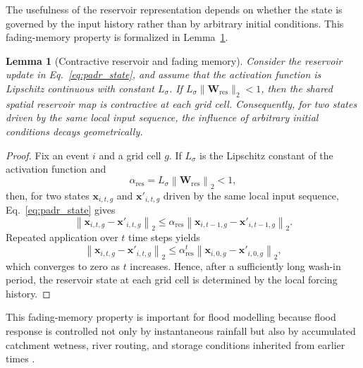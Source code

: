 \documentclass[pdflatex,sn-mathphys-ay]{sn-jnl}
\theoremstyle{thmstyleone}
\newtheorem{lemma}[theorem]{Lemma}
\begin{document}
The usefulness of the reservoir representation depends on whether the
state is governed by the input history rather than by arbitrary initial
conditions.  This fading-memory property is formalized in
Lemma~\ref{lem:echo_state}.

\begin{lemma}[Contractive reservoir and fading memory]
\label{lem:echo_state}
Consider the reservoir update in Eq.~\eqref{eq:padr_state}, and assume
that the activation function is Lipschitz continuous with constant
$L_{\sigma}$.  If
$L_{\sigma}\|\mathbf{W}_{\mathrm{res}}\|_{2}<1$, then the shared
spatial reservoir map is contractive at each grid cell.  Consequently,
for two states driven by the same local input sequence, the influence
of arbitrary initial conditions decays geometrically.
\end{lemma}

\begin{proof}
Fix an event $i$ and a grid cell $g$.  If $L_{\sigma}$ is the
Lipschitz constant of the activation function and
\begin{equation}
  \alpha_{\mathrm{res}}
  =
  L_{\sigma}
  \left\|
    \mathbf{W}_{\mathrm{res}}
  \right\|_{2}
  <1,
  \label{eq:reservoir_contractivity_condition}
\end{equation}
then, for two states $\mathbf{x}_{i,t,g}$ and $\mathbf{x}'_{i,t,g}$
driven by the same local input sequence, Eq.~\eqref{eq:padr_state}
gives
\begin{equation}
  \left\|
    \mathbf{x}_{i,t,g}
    -
    \mathbf{x}'_{i,t,g}
  \right\|_{2}
  \leq
  \alpha_{\mathrm{res}}
  \left\|
    \mathbf{x}_{i,t-1,g}
    -
    \mathbf{x}'_{i,t-1,g}
  \right\|_{2}.
  \label{eq:reservoir_one_step}
\end{equation}
Repeated application over $t$ time steps yields
\begin{equation}
  \left\|
    \mathbf{x}_{i,t,g}
    -
    \mathbf{x}'_{i,t,g}
  \right\|_{2}
  \leq
  \alpha_{\mathrm{res}}^{t}
  \left\|
    \mathbf{x}_{i,0,g}
    -
    \mathbf{x}'_{i,0,g}
  \right\|_{2},
  \label{eq:reservoir_fading_memory}
\end{equation}
which converges to zero as $t$ increases.  Hence, after a sufficiently
long wash-in period, the reservoir state at each grid cell is
determined by the local forcing history.
\end{proof}

This fading-memory property is important for flood modelling because
flood response is controlled not only by instantaneous rainfall but
also by accumulated catchment wetness, river routing, and storage
conditions inherited from earlier times
\citep{Jaeger2001EchoState,Herbert2004}.
\end{document}
